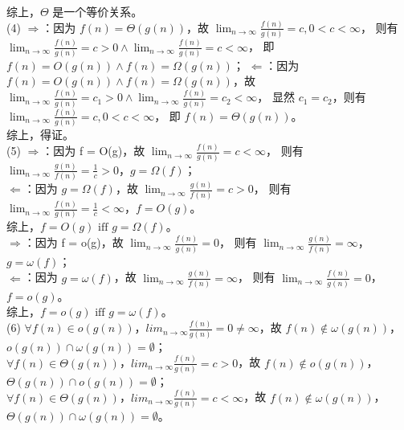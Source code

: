 \documentclass[12pt, a4paper, oneside]{ctexart}
\begin{document}
\begin{solution}[2.7]
综上，$\Theta$ 是一个等价关系。
\\(4) $\Rightarrow$：因为 $f(n) = \Theta(g(n))$，故 $\lim_{n \rightarrow \infty} \frac{f(n)}{g(n)} = c, 0 < c < \infty$，
则有 $\lim_{n \rightarrow \infty} \frac{f(n)}{g(n)} = c > 0 \land \lim_{n \rightarrow \infty} \frac{f(n)}{g(n)} = c < \infty$，
即 $f(n) = O(g(n)) \land f(n) = \Omega(g(n))$；
\newpage
$\Leftarrow$：因为 $f(n) = O(g(n)) \land f(n) = \Omega(g(n))$，故 $\lim_{n \rightarrow \infty} \frac{f(n)}{g(n)} = c_1 > 0 \land \lim_{n \rightarrow \infty} \frac{f(n)}{g(n)} = c_2 < \infty$，
显然 $c_1 = c_2$，则有 $\lim_{n \rightarrow \infty} \frac{f(n)}{g(n)} = c, 0 < c < \infty$，
即 $f(n) = \Theta(g(n))$。
\\综上，得证。
\\(5) $\Rightarrow$：因为 f = O(g)，故 $\lim_{n \rightarrow \infty} \frac{f(n)}{g(n)} = c < \infty$，
则有 $\lim_{n \rightarrow \infty} \frac{g(n)}{f(n)} = \frac{1}{c} > 0$，$g = \Omega(f)$；
\\$\Leftarrow$：因为 $g = \Omega(f)$，故  $\lim_{n \rightarrow \infty} \frac{g(n)}{f(n)} = c > 0$，
则有 $\lim_{n \rightarrow \infty} \frac{f(n)}{g(n)} = \frac{1}{c} < \infty$，$f = O(g)$。
\\综上，$f = O(g) \text{ iff } g = \Omega(f)$。
\\$\Rightarrow$：因为 f = o(g)，故 $\lim_{n \rightarrow \infty} \frac{f(n)}{g(n)} = 0$，
则有 $\lim_{n \rightarrow \infty} \frac{g(n)}{f(n)} = \infty$，$g = \omega(f)$；
\\$\Leftarrow$：因为 $g = \omega(f)$，故  $\lim_{n \rightarrow \infty} \frac{g(n)}{f(n)} = \infty$，
则有 $\lim_{n \rightarrow \infty} \frac{f(n)}{g(n)} = 0$，$f = o(g)$。
\\综上，$f = o(g) \text{ iff } g = \omega(f)$。
\\(6) $\forall f(n) \in o(g(n))$，$lim_{n \rightarrow \infty} \frac{f(n)}{g(n)} = 0 \neq \infty$，故 $f(n) \notin \omega(g(n))$，
\\$o(g(n)) \cap \omega(g(n)) = \emptyset$；
\\$\forall f(n) \in \Theta(g(n))$，$lim_{n \rightarrow \infty} \frac{f(n)}{g(n)} = c > 0$，故 $f(n) \notin o(g(n))$，
\\$\Theta(g(n)) \cap o(g(n)) = \emptyset$；
\\$\forall f(n) \in \Theta(g(n))$，$lim_{n \rightarrow \infty} \frac{f(n)}{g(n)} = c < \infty$，故 $f(n) \notin \omega(g(n))$，
\\$\Theta(g(n)) \cap \omega(g(n)) = \emptyset$。
\end{solution}
\end{document}
